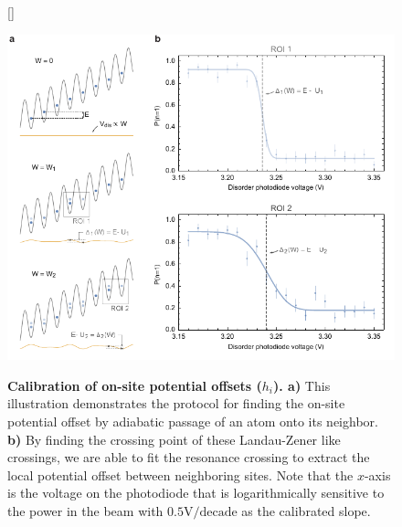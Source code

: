 
\begin{figure}
[\FBwidth]
{\caption{\textbf{Calibration of on-site potential offsets ($h_i$). a)} This illustration demonstrates the protocol for finding the on-site potential offset by adiabatic passage of an atom onto its neighbor. \textbf{b)} By finding the crossing point of these Landau-Zener like crossings, we are able to fit the resonance crossing to extract the local potential offset between neighboring sites. Note that the $x$-axis is the voltage on the photodiode that is logarithmically sensitive to the power in the beam with $0.5\text{V/decade}$ as the calibrated slope.}
		\label{fig:WCal}	}
{\includegraphics[width=4 in]{figures/ch2/disorder_cal/Wcalv2edit.pdf} }
\end{figure}


